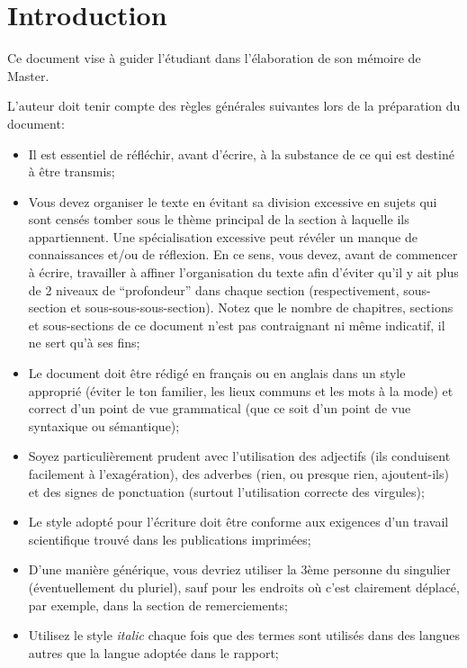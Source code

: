 
\chapter{Introduction} 	%
\label{Chapter1} 		%

Ce document vise à guider l'étudiant dans l'élaboration de son mémoire de Master.

L'auteur doit tenir compte des règles générales suivantes lors de la préparation du document:
\begin{itemize}
    \item Il est essentiel de réfléchir, avant d'écrire, à la substance de ce qui est destiné à être transmis;
    \item Vous devez organiser le texte en évitant sa division excessive en sujets qui sont censés tomber sous le thème principal de la section à laquelle ils appartiennent. Une spécialisation excessive peut révéler un manque de connaissances et/ou de réflexion. En ce sens, vous devez, avant de commencer à écrire, travailler à affiner l'organisation du texte afin d'éviter qu'il y ait plus de 2 niveaux de ``profondeur'' dans chaque section (respectivement, sous-section et sous-sous-sous-section). Notez que le nombre de chapitres, sections et sous-sections de ce document n'est pas contraignant ni même indicatif, il ne sert qu'à ses fins;
    \item Le document doit être rédigé en français ou en anglais dans un style approprié (éviter le ton familier, les lieux communs et les mots à la mode) et correct d'un point de vue grammatical (que ce soit d'un point de vue syntaxique ou sémantique);
    \item Soyez particulièrement prudent avec l'utilisation des adjectifs (ils conduisent facilement à l'exagération), des adverbes (rien, ou presque rien, ajoutent-ils) et des signes de ponctuation (surtout l'utilisation correcte des virgules);
    \item Le style adopté pour l'écriture doit être conforme aux exigences d'un travail scientifique trouvé dans les publications imprimées;
    \item D'une manière générique, vous devriez utiliser la 3ème personne du singulier (éventuellement du pluriel), sauf pour les endroits où c'est clairement déplacé, par exemple, dans la section de remerciements;
    \item Utilisez le style \textit{italic} chaque fois que des termes sont utilisés dans des langues autres que la langue adoptée dans le rapport;

\end{itemize}
